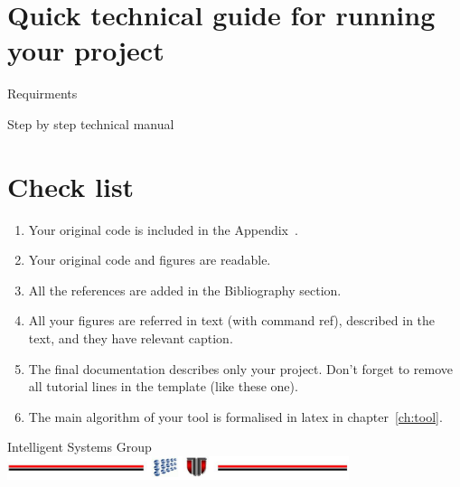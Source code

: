 \documentclass[a4paper,12pt]{report}
\begin{document}
\chapter{Quick technical guide for running your project}

Requirments

Step by step technical manual

%

\chapter{Check list}

\begin{enumerate}
 \item Your original code is included in the Appendix~\label{app:code}.
 \item Your original code and figures are readable.
 \item All the references are added in the Bibliography section.
  \item All your figures are referred in text (with command ref{}), described in the text, and they have relevant caption.
 \item The final documentation describes only your project. Don't forget to remove all tutorial lines in the template (like these one).
 \item The main algorithm of your tool is formalised in latex in chapter~\ref{ch:tool}.
  
\end{enumerate}






\vspace{2cm}
\begin{center}
Intelligent Systems Group\\
\includegraphics[width=10cm]{fig/footer}
\end{center}
\end{document}
